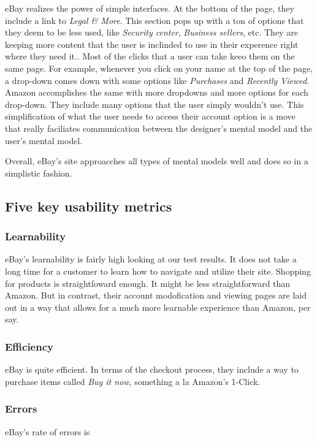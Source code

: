 \documentclass[11pt, oneside]{article}
\begin{document}
eBay realizes the power of simple interfaces. At the bottom of the page, they include a link to \textit{Legal \& More}. This section pops up with a ton of options that they deem to be less used, like \textit{Security center}, \textit{Business sellers}, etc. They are keeping more content that the user is inclinded to use in their experence right where they need it.. Most of the clicks that a user can take keeo them on the same page. For example, whenever you click on your name at the top of the page, a drop-down comes down with some options like \textit{Purchases} and \textit{Recently Viewed}. Amazon accomplishes the same with more dropdowns and more options for each drop-down. They include many options that the user simply wouldn't use. This simplification of what the user needs to access their account option is a move that really faciliates communication between the designer's mental model and the user's mental model.

Overall, eBay's site approacches all types of mental models well and does so in a simplistic fashion.

\subsection{Five key usability metrics}
\subsubsection{Learnability}
eBay's learnability is fairly high looking at our test results. It does not take a long time for a customer to learn how to navigate and utilize their site. Shopping for products is straightfoward enough. It might be less straightforward than Amazon. But in contrast, their account modofication and viewing pages are laid out in a way that allows for a much more learnable experience than Amazon, per say. 

\subsubsection{Efficiency}

eBay is quite efficient. In terms of the checkout process, they include a way to purchase items called \textit{Buy it now}, something a la Amazon's 1-Click\textregistered.

\subsubsection{Errors}
eBay's rate of errors is 
\end{document}
